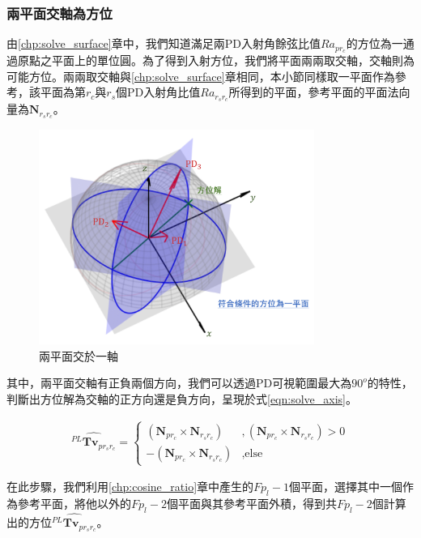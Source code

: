     \subsubsection{兩平面交軸為方位}
    \label{chp:solve_axis}

        由\ref{chp:solve_surface}章中，我們知道滿足兩PD入射角餘弦比值$Ra_{pr_c}$的方位為一通過原點之平面上的單位圓。為了得到入射方位，我們將平面兩兩取交軸，交軸則為可能方位。兩兩取交軸與\ref{chp:solve_surface}章相同，本小節同樣取一平面作為參考，該平面為第$r_c$與$r_s$個PD入射角比值$Ra_{r_sr_c}$所得到的平面，參考平面的平面法向量為$\boldsymbol{N}_{r_sr_c}$。
        
        \begin{figure}[h!]
            \centering
            \includegraphics[width=9cm]{ch3pic/solve_axis.png}
            \caption{兩平面交於一軸}
            \label{pic:solve_axis}
        \end{figure}

        其中，兩平面交軸有正負兩個方向，我們可以透過PD可視範圍最大為$90^o$的特性，判斷出方位解為交軸的正方向還是負方向，呈現於式\ref{eqn:solve_axis}。
   
        \begin{gather}
            \label{eqn:solve_axis}
             \hat{{^{PL}\boldsymbol{Tv}}_{p{r_sr_c}}} = 
             \begin{cases}
                (\boldsymbol{N}_{pr_c}\times \boldsymbol{N}_{r_sr_c})&,(\boldsymbol{N}_{pr_c}\times \boldsymbol{N}_{r_sr_c})>0\\
                -(\boldsymbol{N}_{pr_c}\times \boldsymbol{N}_{r_sr_c})&,\text{else}
             \end{cases}
        \end{gather}

        在此步驟，我們利用\ref{chp:cosine_ratio}章中產生的$Fp_l-1$個平面，選擇其中一個作為參考平面，將他以外的$Fp_l-2$個平面與其參考平面外積，得到共$Fp_l-2$個計算出的方位$\hat{{^{PL}\boldsymbol{Tv}}_{p{r_sr_c}}}$。



